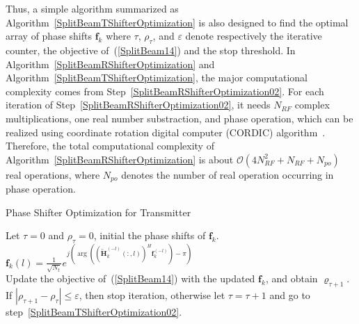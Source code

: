 \documentclass[11pt,draftcls,onecolumn]{IEEEtran}
\begin{document}
Thus, a simple algorithm summarized as Algorithm~\ref{SplitBeamTShifterOptimization} is also designed to find the optimal array of phase shifts $\bm{f}_{k}$ where $\tau$, $\rho_{\tau}$, and $\varepsilon$ denote respectively the iterative counter, the objective of~(\ref{SplitBeam14}) and the stop threshold. In Algorithm~\ref{SplitBeamRShifterOptimization} and Algorithm~\ref{SplitBeamTShifterOptimization}, the major computational complexity comes from Step~\ref{SplitBeamRShifterOptimization02}. For each iteration of Step~\ref{SplitBeamRShifterOptimization02}, it needs $N_{RF}$ complex multiplications, one real number substraction, and phase operation, which can be realized using coordinate rotation digital computer (CORDIC) algorithm~\cite{CofKimar2011}. Therefore, the total computational complexity of Algorithm~\ref{SplitBeamRShifterOptimization} is about $\mathcal{O}\left(4N_{RF}^{2}+N_{RF}+N_{po}\right)$ real operations, where $N_{po}$ denotes the number of real operation occurring in phase operation.
\begin{algorithm}
\caption{Phase Shifter Optimization for Transmitter}\label{SplitBeamTShifterOptimization}
\begin{algorithmic}[1]
\STATE Let $\tau=0$ and $\rho_{\tau}=0$, initial the phase shifts of $\bm{f}_{k}$.\label{SplitBeamTShifterOptimization01}
 \label{SplitBeamTShifterOptimization02}
\STATE $\bm{f}_{k}\left(l\right)=\frac{1}{\sqrt{N_{t}}}e^{j\left(\arg\left(\left(\overleftarrow{\bm{H}}_{k}^{\left(-l\right)}
\left(:,l\right)\right)^{H}\bm{f}_{k}^{\left(-l\right)}\right)-\pi\right)}$\\
\ENDFOR
\STATE Update the objective of~(\ref{SplitBeam14}) with the updated $\bm{f}_{k}$, and obtain $\varrho_{\tau+1}$.
\STATE If $\left|\rho_{\tau+1}-\rho_{\tau}\right|\leq\varepsilon$, then stop iteration, otherwise let $\tau=\tau+1$ and go to step~\ref{SplitBeamTShifterOptimization02}.
\end{algorithmic}
\end{algorithm}
\end{document}
